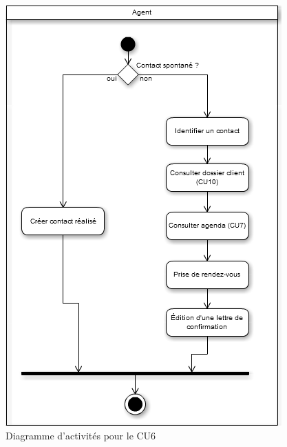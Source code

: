\begin{figure}[H]
	\begin{center}
		\includegraphics[scale=0.4]{Includes/SOA-Activite-CU6.png}
		\caption{Diagramme d'activités pour le CU6}
	\end{center}
\end{figure}

